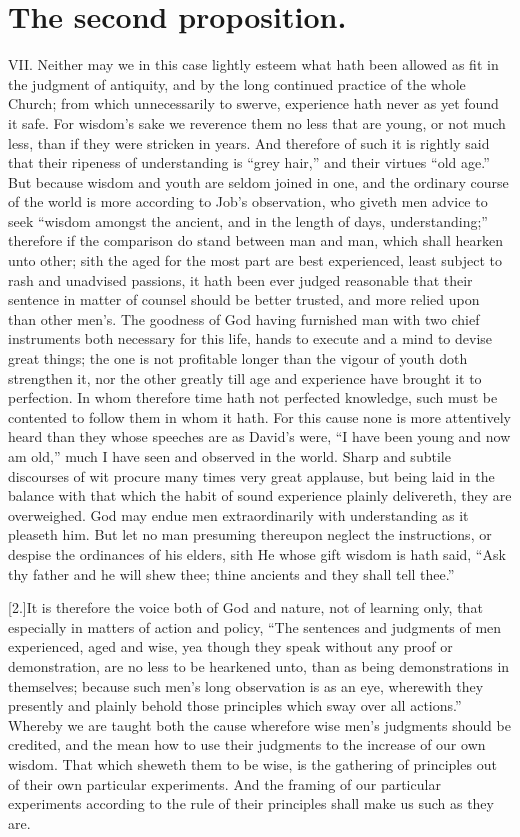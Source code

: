\section*{The second proposition.}
VII. Neither may we in this case lightly esteem what hath been allowed as fit in the judgment of antiquity, and by the long continued practice of the whole Church; from which unnecessarily to swerve, experience hath never as yet found it safe. For wisdom’s sake we reverence them no less that are young, or not much less, than if they were stricken in years. And therefore of such it is rightly said that their ripeness of understanding is “grey hair,” and their virtues “old age.” But because wisdom and youth are seldom joined in one, and the ordinary course of the world is more according to Job’s observation, who giveth men advice to seek “wisdom amongst the ancient, and in the length of days, understanding;” therefore if the comparison do stand between man and man, which shall hearken unto other; sith the aged for the most part are best experienced, least subject to rash and unadvised passions, it hath been ever judged reasonable that their sentence in matter of counsel should be better trusted, and more relied upon than other men’s. The goodness of God having furnished man with two chief instruments  both necessary for this life,
 hands to execute and a mind to devise great things; the one is not profitable longer than the vigour of youth doth strengthen it, nor the other greatly till age and experience have brought it to perfection. In whom therefore time hath not perfected knowledge, such must be contented to follow them in whom it hath. For this cause none is more attentively heard than they whose speeches are as David’s were, “I have been young and now am old,” much I have seen and observed in the world. Sharp and subtile discourses of wit procure many times very great applause, but being laid in the balance with that which the habit of sound experience plainly delivereth, they are overweighed. God may endue men extraordinarily with understanding as it pleaseth him. But let no man presuming thereupon neglect the instructions, or despise the ordinances of his elders, sith He whose gift wisdom is hath said, “Ask thy father and he will shew thee; thine ancients and they shall tell thee.”

[2.]It is therefore the voice both of God and nature, not of learning only, that especially in matters of action and policy, “The sentences and judgments of men experienced, aged and wise, yea though they speak without any proof or demonstration, are no less to be hearkened unto, than as being demonstrations in themselves; because such men’s long observation is as an eye, wherewith they presently and plainly behold those principles which sway over all actions.” Whereby we are taught both the cause wherefore wise men’s judgments should be credited, and the mean how to use their judgments to the increase of our own wisdom. That which sheweth them to be wise, is the gathering of principles out of their own particular experiments. And the framing of our particular experiments according to the rule of their principles shall make us such as they are.

